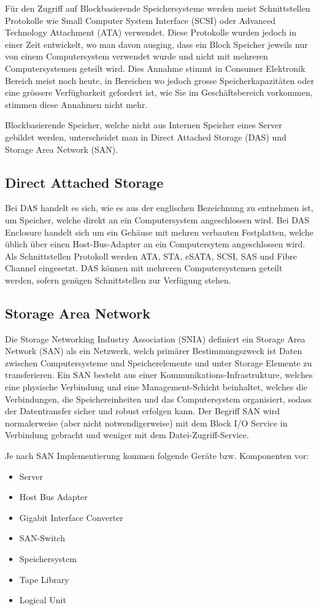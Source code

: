 Für den Zugriff auf Blockbasierende Speichersysteme werden meist Schnittstellen Protokolle wie Small Computer System Interface (SCSI) oder Advanced Technology Attachment (ATA) verwendet. Diese Protokolle wurden jedoch in einer Zeit entwickelt, wo man davon ausging, dass ein Block Speicher jeweils nur von einem Computersystem verwendet wurde und nicht mit mehreren Computersystemen geteilt wird. Dies Annahme stimmt in Consumer Elektronik Bereich meist noch heute, in Bereichen wo jedoch grosse Speicherkapazitäten oder eine grössere Verfügbarkeit gefordert ist, wie Sie im Geschäftsbereich vorkommen, stimmen diese Annahmen nicht mehr.

Blockbasierende Speicher, welche nicht aus Internen Speicher eines Server gebildet werden, unterscheidet man in Direct Attached Storage (DAS) und Storage Area Network (SAN). 

\subsection{Direct Attached Storage}
Bei DAS handelt es sich, wie es aus der englischen Bezeichnung zu entnehmen ist, um Speicher, welche direkt an ein Computersystem angeschlossen wird. Bei DAS Enclosure handelt sich um ein Gehäuse mit mehren verbauten Festplatten, welche üblich über einen Host-Bus-Adapter an ein Computersytem angeschlossen wird. Als Schnittstellen Protokoll werden ATA, STA, eSATA, SCSI, SAS und Fibre Channel eingesetzt. DAS können mit mehreren Computersystemen geteilt werden, sofern genügen Schnittstellen zur Verfügung stehen.


\subsection{Storage Area Network}
Die Storage Networking Industry Association (SNIA) definiert ein Storage Area Network (SAN) als ein Netzwerk, welch primärer Bestimmungszweck ist Daten zwischen Computersysteme und Speicherelemente und unter Storage Elemente zu transferieren. Ein SAN besteht aus einer Kommunikations-Infrastrukture, welches eine physische Verbindung und eine Management-Schicht beinhaltet, welches die Verbindungen, die Speichereinheiten und das Computersystem organisiert, sodass der Datentransfer sicher und robust erfolgen kann. Der Begriff SAN wird normalerweise (aber nicht notwendigerweise) mit dem Block I/O Service in Verbindung gebracht und weniger mit dem Datei-Zugriff-Service.\cite{SNIA2011}

Je nach SAN Implementierung kommen folgende Geräte bzw. Komponenten vor:
\begin{itemize}
\item Server
\item Host Bus Adapter
\item Gigabit Interface Converter
\item SAN-Switch
\item Speichersystem
\item Tape Library
\item Logical Unit
\end{itemize}

